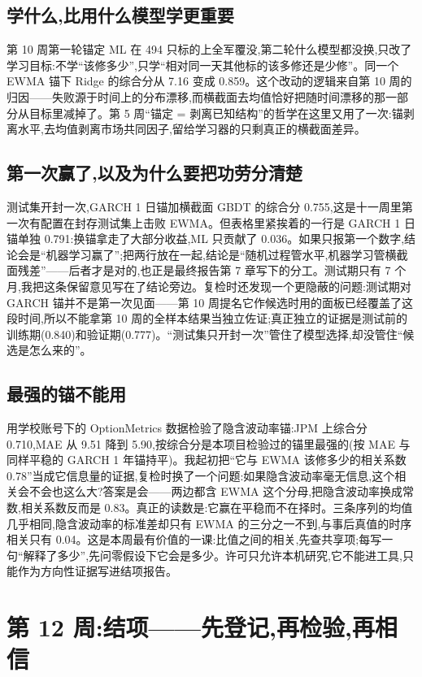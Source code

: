 \documentclass[11pt]{ctexart}
\begin{document}
\subsection{学什么,比用什么模型学更重要}
第 10 周第一轮锚定 ML 在 494 只标的上全军覆没,第二轮什么模型都没换,只改了学习目标:不学“该修多少”,只学“相对同一天其他标的该多修还是少修”。同一个 EWMA 锚下 Ridge 的综合分从 7.16 变成 0.859。这个改动的逻辑来自第 10 周的归因——失败源于时间上的分布漂移,而横截面去均值恰好把随时间漂移的那一部分从目标里减掉了。第 5 周“锚定 = 剥离已知结构”的哲学在这里又用了一次:锚剥离水平,去均值剥离市场共同因子,留给学习器的只剩真正的横截面差异。

\subsection{第一次赢了,以及为什么要把功劳分清楚}
测试集开封一次,GARCH 1 日锚加横截面 GBDT 的综合分 0.755,这是十一周里第一次有配置在封存测试集上击败 EWMA。但表格里紧挨着的一行是 GARCH 1 日锚单独 0.791:换锚拿走了大部分收益,ML 只贡献了 0.036。如果只报第一个数字,结论会是“机器学习赢了”;把两行放在一起,结论是“随机过程管水平,机器学习管横截面残差”——后者才是对的,也正是最终报告第 7 章写下的分工。测试期只有 7 个月,我把这条保留意见写在了结论旁边。复检时还发现一个更隐蔽的问题:测试期对 GARCH 锚并不是第一次见面——第 10 周提名它作候选时用的面板已经覆盖了这段时间,所以不能拿第 10 周的全样本结果当独立佐证;真正独立的证据是测试前的训练期(0.840)和验证期(0.777)。“测试集只开封一次”管住了模型选择,却没管住“候选是怎么来的”。

\subsection{最强的锚不能用}
用学校账号下的 OptionMetrics 数据检验了隐含波动率锚:JPM 上综合分 0.710,MAE 从 9.51 降到 5.90,按综合分是本项目检验过的锚里最强的(按 MAE 与同样平稳的 GARCH 1 年锚持平)。我起初把“它与 EWMA 该修多少的相关系数 0.78”当成它信息量的证据,复检时换了一个问题:如果隐含波动率毫无信息,这个相关会不会也这么大?答案是会——两边都含 EWMA 这个分母,把隐含波动率换成常数,相关系数反而是 0.83。真正的读数是:它赢在平稳而不在择时。三条序列的均值几乎相同,隐含波动率的标准差却只有 EWMA 的三分之一不到,与事后真值的时序相关只有 0.04。这是本周最有价值的一课:比值之间的相关,先查共享项;每写一句“解释了多少”,先问零假设下它会是多少。许可只允许本机研究,它不能进工具,只能作为方向性证据写进结项报告。

\section{第 12 周:结项——先登记,再检验,再相信}
\end{document}
